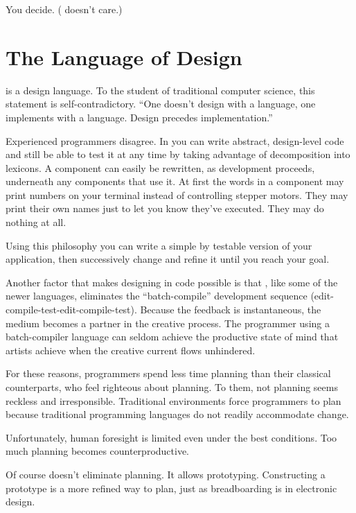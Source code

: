 You decide. (\Forth{} doesn't care.)


\section{The Language of Design}
%
\Forth{} is a design language. To the student of traditional computer
science, this statement is self-contradictory. ``One doesn't design
with a language, one implements with a language.  Design precedes
implementation.''

Experienced \Forth{} programmers disagree. In \Forth{} you can write
abstract, design-level code and still be able to test it at any time
by taking advantage of decomposition into lexicons. A component can
easily be rewritten, as development proceeds, underneath any
components that use it. At first the words in a component may print
numbers on your terminal instead of controlling stepper motors. They
may print their own names just to let you know they've executed. They
may do nothing at all.

Using this philosophy you can write a simple by testable version of
your application, then successively change and refine it until you
reach your goal.

Another factor that makes designing in code possible is that \Forth{},
like some of the newer languages, eliminates the ``batch-compile''%
development sequence (edit-compile-test-edit-compile-test). Because
the feedback is instantaneous, the medium becomes a partner in the
creative process. The programmer using a batch-compiler language can
seldom achieve the productive state of mind that artists achieve when
the creative current flows unhindered.

For these reasons, \Forth{} programmers spend less time planning than
their classical counterparts, who feel righteous about planning. To
them, not planning seems reckless and irresponsible. Traditional
environments force programmers to plan because traditional programming
languages do not readily accommodate change.

Unfortunately, human foresight is limited even under the best
conditions.  Too much planning becomes counterproductive.

Of course \Forth{} doesn't eliminate planning. It allows prototyping.%
Constructing a prototype is a more refined way to plan, just as
breadboarding is in electronic design.

